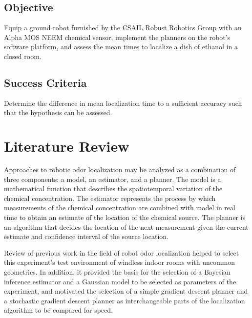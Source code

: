 \documentclass[submit]{aiaa-pretty-modified}
\begin{document}
\subsection*{Objective}
Equip a ground robot furnished by the CSAIL Robust Robotics Group with an
Alpha MOS NEEM chemical sensor, implement the planners on the robot’s
software platform, and assess the mean times to localize a dish of ethanol in a
closed room.

\subsection*{Success Criteria} 
Determine the difference in mean localization time to a sufficient accuracy such
that the hypothesis can be assessed.

\section{Literature Review}
Approaches to robotic odor localization may be analyzed as a combination of
three components: a model, an estimator, and a planner. The model is a
mathematical function that describes the spatiotemporal variation of the
chemical concentration. The estimator represents the process by which
measurements of the chemical concentration are combined with model in real time
to obtain an estimate of the location of the chemical source. The planner is an
algorithm that decides the location of the next measurement given the current
estimate and confidence interval of the source location.

Review of previous work in the field of robot odor localization helped to select
this experiment’s test environment of windless indoor rooms with uncommon
geometries. In addition, it provided the basis for the selection of a Bayesian inference
estimator and a Gaussian model to be selected as parameters of the experiment, and
motivated the selection of a simple gradient descent planner and a stochastic
gradient descent planner as interchangeable parts of the localization algorithm
to be compared for speed.
\end{document}
